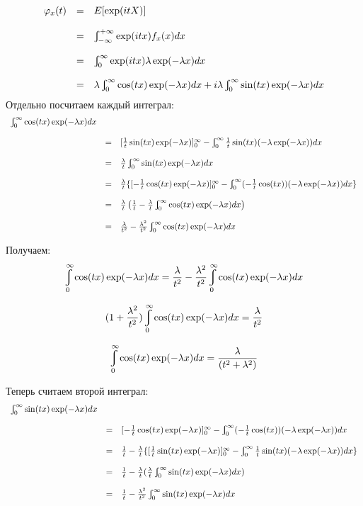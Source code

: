 \documentclass[a4paper,12pt, oneside]{article}
\let\int\varint
\begin{document}
	$$
	\begin{array}{rcl}
	\varphi_x(t) &=& E[\exp(itX)]\\
	\\
	&=&\int_{-\infty}^{+\infty} \exp(itx) f_x(x)dx\\
	\\
	&=&\int_0^\infty \exp(itx) \lambda \exp(-\lambda x)dx\\
	\\
	&=&\lambda \int_0^\infty \cos(tx)\exp(-\lambda x)dx + i\lambda \int_0^\infty \sin(tx)\exp(-\lambda x)dx
	\end{array}
	$$
	Отдельно посчитаем каждый интеграл:
	$$
	\begin{array}{rcl}
	\int_0^\infty \cos(tx)\exp(-\lambda x)dx \\
	\\
	&=&[\frac{1}{t} \sin(tx) \exp(-\lambda x)]_0^\infty - \int_0^\infty \frac{1}{t} \sin(tx)(-\lambda \exp(-\lambda x))dx\\
	\\
	&=&\frac{\lambda}{t} \int_0^\infty \sin(tx) \exp(-\lambda x)dx\\
	\\
	&=&\frac{\lambda}{t}\{[-\frac{1}{t} \cos(tx) \exp(-\lambda x)]_0^\infty - \int_0^\infty (-\frac{1}{t} \cos(tx))(-\lambda \exp(-\lambda x))dx\}\\
	\\
	&=&\frac{\lambda}{t}\left(\frac{1}{t} - \frac{\lambda}{t} \int_0^\infty \cos(tx) \exp(-\lambda x)dx\right)\\
	\\
	&=&\frac{\lambda}{t^2} - \frac{\lambda ^2}{t^2} \int_{0}^{\infty} \cos(tx) \exp(-\lambda x)dx
	\end{array}
	$$
	
	Получаем:
	$$
	\int_0^\infty \cos(tx)\exp(-\lambda x)dx = \frac{\lambda}{t^2} - \frac{\lambda ^2}{t^2} \int_{0}^{\infty} \cos(tx) \exp(-\lambda x)dx
	$$
	
	$$
	(1 + \frac{\lambda^2}{t^2})\int_0^\infty \cos(tx)\exp(-\lambda x)dx = \frac{\lambda}{t^2}
	$$
	
	$$
	\int_0^\infty \cos(tx)\exp(-\lambda x)dx = \frac{\lambda}{(t^2 + \lambda^2)}
	$$
	
	Теперь считаем второй интеграл:
	$$
	\begin{array}{rcl}
	 \int_0^\infty \sin(tx)\exp(-\lambda x)dx\\
	 \\
	 &=&[-\frac{1}{t} \cos(tx) \exp(-\lambda x)]_0^\infty- \int_{0}^{\infty}(-\frac{1}{t} \cos(tx))(-\lambda \exp(-\lambda x))dx\\
	 \\
	 &=&\frac{1}{t} - \frac{\lambda}{t}\{ [\frac{1}{t} \sin(tx)\exp(-\lambda x)]_0^\infty - \int_{0}^{\infty} \frac{1}{t} \sin(tx) (-\lambda \exp(-\lambda x ))dx  \}\\
	 \\
	 &=&\frac{1}{t} - \frac{\lambda}{t} (\frac{\lambda}{t} \int_0^\infty \sin(tx) \exp(-\lambda x)dx)\\
	 \\
	  &=&\frac{1}{t} - \frac{\lambda ^2}{t^2} \int_{0}^{\infty} \sin(tx) \exp(-\lambda x)dx
	 \end{array}
	$$
	
\end{document}
